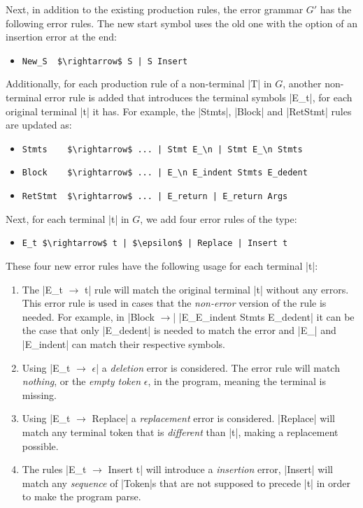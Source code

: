 Next, in addition to the existing production rules, the error grammar $G'$ has
the following error rules. The new start symbol uses the old one with the option
of an insertion error at the end:
\begin{itemize}
  \item \lstinline{New_S  $\rightarrow$ S | S Insert}
\end{itemize}
Additionally, for each production rule of a non-terminal |T| in $G$, another
non-terminal error rule is added that introduces the terminal symbols |E_t|, for
each original terminal |t| it has. For example, the |Stmts|, |Block| and
|RetStmt| rules are updated as:
\begin{itemize}
  \item \lstinline{Stmts    $\rightarrow$ ... | Stmt E_\n | Stmt E_\n Stmts}
  \item \lstinline{Block    $\rightarrow$ ... | E_\n E_indent Stmts E_dedent}
  \item \lstinline{RetStmt  $\rightarrow$ ... | E_return | E_return Args}
\end{itemize}
Next, for each terminal |t| in $G$, we add four error rules of the type:
\begin{itemize}
  \item \lstinline{E_t $\rightarrow$ t | $\epsilon$ | Replace | Insert t}
\end{itemize}
These four new error rules have the following usage for each terminal |t|:
\begin{enumerate}
  \item The |E_t $\rightarrow$ t| rule will match the original terminal |t|
  without any errors. This error rule is used in cases that the \emph{non-error}
  version of the rule is needed. For example, in |Block $\rightarrow$| \break
  |E_\n E_indent Stmts E_dedent| it can be the case that only
  |E_dedent| is needed to match the error and |E_\n| and |E_indent| can match
  their respective symbols.
  \item Using |E_t $\rightarrow$ $\epsilon$| a \emph{deletion} error is
  considered. The error rule will match \emph{nothing}, or the \emph{empty
  token} $\epsilon$, in the program, meaning the terminal is missing.
  \item Using |E_t $\rightarrow$ Replace| a \emph{replacement} error is considered.
  |Replace| will match any terminal token that is \emph{different} than |t|,
  making a replacement possible.
  \item  The rules |E_t $\rightarrow$ Insert t| will introduce a \emph{insertion} error,
  \ie |Insert| will match any \emph{sequence} of |Token|s that are not supposed
  to precede |t| in order to make the program parse.
\end{enumerate}
